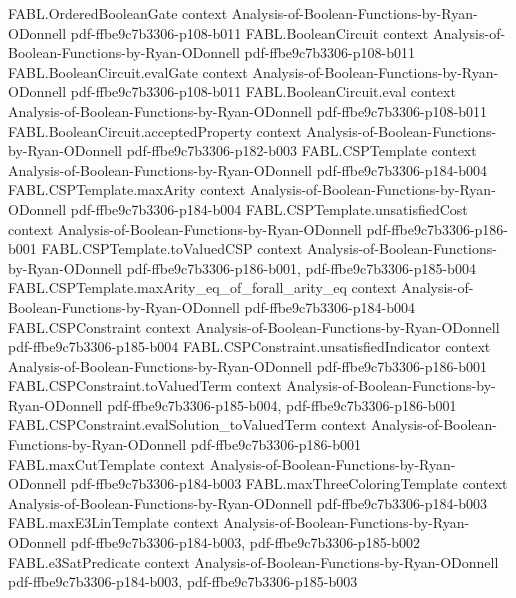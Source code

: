 \begin{theorem}
\proofstep
  {FABL.OrderedBooleanGate}
  {context}
  {Analysis-of-Boolean-Functions-by-Ryan-ODonnell}
  {pdf-ffbe9c7b3306-p108-b011}
\proofstep
  {FABL.BooleanCircuit}
  {context}
  {Analysis-of-Boolean-Functions-by-Ryan-ODonnell}
  {pdf-ffbe9c7b3306-p108-b011}
\proofstep
  {FABL.BooleanCircuit.evalGate}
  {context}
  {Analysis-of-Boolean-Functions-by-Ryan-ODonnell}
  {pdf-ffbe9c7b3306-p108-b011}
\proofstep
  {FABL.BooleanCircuit.eval}
  {context}
  {Analysis-of-Boolean-Functions-by-Ryan-ODonnell}
  {pdf-ffbe9c7b3306-p108-b011}
\proofstep
  {FABL.BooleanCircuit.acceptedProperty}
  {context}
  {Analysis-of-Boolean-Functions-by-Ryan-ODonnell}
  {pdf-ffbe9c7b3306-p182-b003}
\proofstep
  {FABL.CSPTemplate}
  {context}
  {Analysis-of-Boolean-Functions-by-Ryan-ODonnell}
  {pdf-ffbe9c7b3306-p184-b004}
\proofstep
  {FABL.CSPTemplate.maxArity}
  {context}
  {Analysis-of-Boolean-Functions-by-Ryan-ODonnell}
  {pdf-ffbe9c7b3306-p184-b004}
\proofstep
  {FABL.CSPTemplate.unsatisfiedCost}
  {context}
  {Analysis-of-Boolean-Functions-by-Ryan-ODonnell}
  {pdf-ffbe9c7b3306-p186-b001}
\proofstep
  {FABL.CSPTemplate.toValuedCSP}
  {context}
  {Analysis-of-Boolean-Functions-by-Ryan-ODonnell}
  {pdf-ffbe9c7b3306-p186-b001,
    pdf-ffbe9c7b3306-p185-b004}
\proofstep
  {FABL.CSPTemplate.maxArity_eq_of_forall_arity_eq}
  {context}
  {Analysis-of-Boolean-Functions-by-Ryan-ODonnell}
  {pdf-ffbe9c7b3306-p184-b004}
\proofstep
  {FABL.CSPConstraint}
  {context}
  {Analysis-of-Boolean-Functions-by-Ryan-ODonnell}
  {pdf-ffbe9c7b3306-p185-b004}
\proofstep
  {FABL.CSPConstraint.unsatisfiedIndicator}
  {context}
  {Analysis-of-Boolean-Functions-by-Ryan-ODonnell}
  {pdf-ffbe9c7b3306-p186-b001}
\proofstep
  {FABL.CSPConstraint.toValuedTerm}
  {context}
  {Analysis-of-Boolean-Functions-by-Ryan-ODonnell}
  {pdf-ffbe9c7b3306-p185-b004,
    pdf-ffbe9c7b3306-p186-b001}
\proofstep
  {FABL.CSPConstraint.evalSolution_toValuedTerm}
  {context}
  {Analysis-of-Boolean-Functions-by-Ryan-ODonnell}
  {pdf-ffbe9c7b3306-p186-b001}
\proofstep
  {FABL.maxCutTemplate}
  {context}
  {Analysis-of-Boolean-Functions-by-Ryan-ODonnell}
  {pdf-ffbe9c7b3306-p184-b003}
\proofstep
  {FABL.maxThreeColoringTemplate}
  {context}
  {Analysis-of-Boolean-Functions-by-Ryan-ODonnell}
  {pdf-ffbe9c7b3306-p184-b003}
\proofstep
  {FABL.maxE3LinTemplate}
  {context}
  {Analysis-of-Boolean-Functions-by-Ryan-ODonnell}
  {pdf-ffbe9c7b3306-p184-b003,
    pdf-ffbe9c7b3306-p185-b002}
\proofstep
  {FABL.e3SatPredicate}
  {context}
  {Analysis-of-Boolean-Functions-by-Ryan-ODonnell}
  {pdf-ffbe9c7b3306-p184-b003,
    pdf-ffbe9c7b3306-p185-b003}

\end{theorem}
